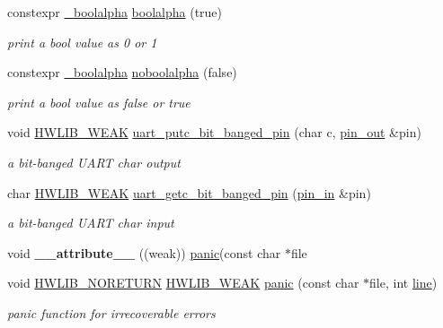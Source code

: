 \begin{DoxyCompactItemize}
constexpr \hyperlink{structhwlib_1_1__boolalpha}{\+\_\+boolalpha} \hyperlink{namespacehwlib_a499e8cd6806e66c4c425b64c9512a21c}{boolalpha} (true)
\begin{DoxyCompactList}\small\item\em print a bool value as \textquotesingle{}0\textquotesingle{} or \textquotesingle{}1\textquotesingle{} \end{DoxyCompactList}\item 
constexpr \hyperlink{structhwlib_1_1__boolalpha}{\+\_\+boolalpha} \hyperlink{namespacehwlib_a6fe77cc67d9850cb262eb6e15e37724d}{noboolalpha} (false)
\begin{DoxyCompactList}\small\item\em print a bool value as \textquotesingle{}false\textquotesingle{} or \textquotesingle{}true\textquotesingle{} \end{DoxyCompactList}\item 
void \hyperlink{hwlib-defines_8hpp_a04be4340016df60d6636c1d1c6d94fc9}{H\+W\+L\+I\+B\+\_\+\+W\+E\+AK} \hyperlink{namespacehwlib_a10ed5b50cabfea49044e22331ac6f284}{uart\+\_\+putc\+\_\+bit\+\_\+banged\+\_\+pin} (char c, \hyperlink{classhwlib_1_1pin__out}{pin\+\_\+out} \&pin)
\begin{DoxyCompactList}\small\item\em a bit-\/banged U\+A\+RT char output \end{DoxyCompactList}\item 
char \hyperlink{hwlib-defines_8hpp_a04be4340016df60d6636c1d1c6d94fc9}{H\+W\+L\+I\+B\+\_\+\+W\+E\+AK} \hyperlink{namespacehwlib_a7dcb57f59ee55d80c76b7b7c09044a2f}{uart\+\_\+getc\+\_\+bit\+\_\+banged\+\_\+pin} (\hyperlink{classhwlib_1_1pin__in}{pin\+\_\+in} \&pin)
\begin{DoxyCompactList}\small\item\em a bit-\/banged U\+A\+RT char input \end{DoxyCompactList}\item 
void {\bfseries \+\_\+\+\_\+attribute\+\_\+\+\_\+} ((weak)) \hyperlink{namespacehwlib_adc07d80c1eeeabf8c96b6acbd5dce78f}{panic}(const char $\ast$file\hypertarget{namespacehwlib_a6f9dea9719c9e4afb73c62ea9f54cf64}{}\label{namespacehwlib_a6f9dea9719c9e4afb73c62ea9f54cf64}

\item 
void \hyperlink{hwlib-defines_8hpp_aef311f1f416fdcbd1fa22376dcc01029}{H\+W\+L\+I\+B\+\_\+\+N\+O\+R\+E\+T\+U\+RN} \hyperlink{hwlib-defines_8hpp_a04be4340016df60d6636c1d1c6d94fc9}{H\+W\+L\+I\+B\+\_\+\+W\+E\+AK} \hyperlink{namespacehwlib_adc07d80c1eeeabf8c96b6acbd5dce78f}{panic} (const char $\ast$file, int \hyperlink{classhwlib_1_1line}{line})
\begin{DoxyCompactList}\small\item\em panic function for irrecoverable errors \end{DoxyCompactList}\end{DoxyCompactItemize}

